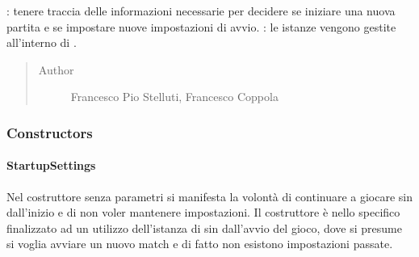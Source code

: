 \documentclass[letterpaper,10pt,italian,openany,oneside]{sphinxmanual}
\begin{document}
\begin{fulllineitems}
\label{\detokenize{source/it/unicam/cs/pa/mastermind/gamecore/StartupSettings:it.unicam.cs.pa.mastermind.gamecore.StartupSettings}}
: tenere traccia delle informazioni necessarie per decidere se iniziare una nuova partita e se impostare nuove impostazioni di avvio. : le istanze vengono gestite all’interno di .
\begin{quote}\begin{description}
\item[{Author}] \leavevmode
Francesco Pio Stelluti, Francesco Coppola

\end{description}\end{quote}

\end{fulllineitems}



\subsubsection{Constructors}
\label{\detokenize{source/it/unicam/cs/pa/mastermind/gamecore/StartupSettings:constructors}}

\paragraph{StartupSettings}
\label{\detokenize{source/it/unicam/cs/pa/mastermind/gamecore/StartupSettings:id1}}

\begin{fulllineitems}
\label{\detokenize{source/it/unicam/cs/pa/mastermind/gamecore/StartupSettings:it.unicam.cs.pa.mastermind.gamecore.StartupSettings.StartupSettings()}}
Nel costruttore senza parametri si manifesta la volontà di continuare a giocare sin dall’inizio e di non voler mantenere impostazioni. Il costruttore è nello specifico finalizzato ad un utilizzo dell’istanza di  sin dall’avvio del gioco, dove si presume si voglia avviare un nuovo match e di fatto non esistono impostazioni passate.

\end{fulllineitems}
\end{document}
